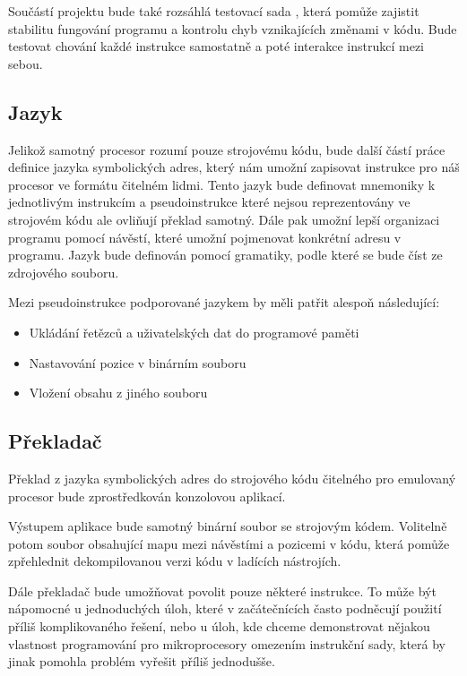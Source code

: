 Součástí projektu bude také rozsáhlá testovací sada , která pomůže zajistit stabilitu fungování programu a kontrolu chyb vznikajících změnami v kódu. Bude testovat chování každé instrukce samostatně a poté interakce instrukcí mezi sebou.

\subsection{Jazyk}

Jelikož samotný procesor rozumí pouze strojovému kódu, bude další částí práce definice jazyka symbolických adres, který nám umožní zapisovat instrukce pro náš procesor ve formátu čitelném lidmi. Tento jazyk bude definovat mnemoniky k jednotlivým instrukcím a pseudoinstrukce které nejsou reprezentovány ve strojovém kódu ale ovliňují překlad samotný. Dále pak umožní lepší organizaci programu pomocí návěstí, které umožní pojmenovat konkrétní adresu v programu. Jazyk bude definován pomocí gramatiky, podle které se bude číst ze zdrojového souboru.

Mezi pseudoinstrukce podporované jazykem by měli patřit alespoň následující:

\begin{itemize}
	\item Ukládání řetězců a uživatelských dat do programové paměti
	\item Nastavování pozice v binárním souboru
	\item Vložení obsahu z jiného souboru
\end{itemize}

\subsection{Překladač}

Překlad z jazyka symbolických adres do strojového kódu čitelného pro emulovaný procesor bude zprostředkován konzolovou aplikací.

Výstupem aplikace bude samotný binární soubor se strojovým kódem. Volitelně potom soubor obsahující mapu mezi návěstími a pozicemi v kódu, která pomůže zpřehlednit dekompilovanou verzi kódu v ladících nástrojích.

Dále překladač bude umožňovat povolit pouze některé instrukce. To může být nápomocné u jednoduchých úloh, které v začátečnících často podněcují použití příliš komplikovaného řešení, nebo u úloh, kde chceme demonstrovat nějakou vlastnost programování pro mikroprocesory omezením instrukční sady, která by jinak pomohla problém vyřešit příliš jednodušše.


